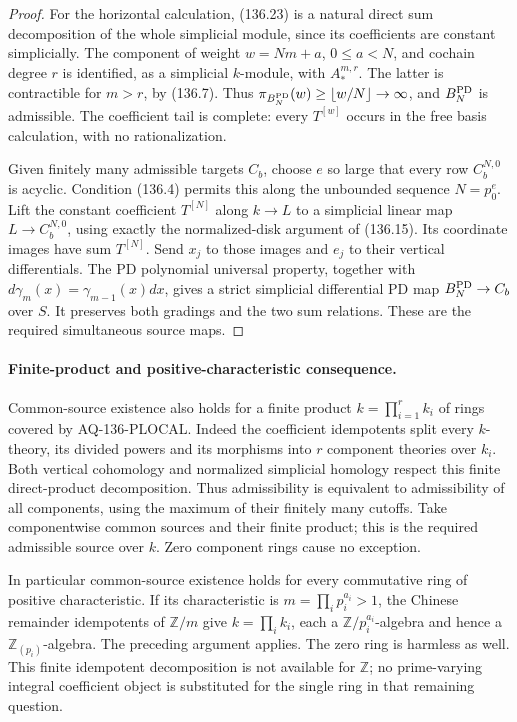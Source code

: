 \begin{proof}
For the horizontal calculation, (136.23) is a natural
direct sum decomposition of the whole simplicial module,
since its coefficients are constant simplicially.
The component of weight $w=Nm+a$, $0\leq a<N$, and
cochain degree $r$ is identified, as a simplicial
$k$-module, with $A_*^{m,r}$.  The latter is contractible
for $m>r$, by (136.7).  Thus
$\pi_{B_N^{\rm PD}}(w)\geq\lfloor w/N\rfloor\to\infty$,
and $B_N^{\rm PD}$ is admissible.  The coefficient tail
is complete: every $T^{[w]}$ occurs in the free basis
calculation, with no rationalization.

Given finitely many admissible targets $C_b$, choose
$e$ so large that every row $C_b^{N,0}$ is acyclic.
Condition (136.4) permits this along the unbounded
sequence $N=p_0^e$.  Lift the constant coefficient
$T^{[N]}$ along $k\to L$ to a simplicial linear map
$L\to C_b^{N,0}$, using exactly the normalized-disk
argument of (136.15).  Its coordinate images have
sum $T^{[N]}$.  Send $x_j$ to those images and
$e_j$ to their vertical differentials.  The PD
polynomial universal property, together with
$d\gamma_m(x)=\gamma_{m-1}(x)dx$, gives a strict
simplicial differential PD map
$B_N^{\rm PD}\to C_b$ over $S$.
It preserves both gradings and the two sum relations.
These are the required simultaneous source maps.
\end{proof}

\paragraph{Finite-product and positive-characteristic consequence.}
Common-source existence also holds for a finite product
$k=\prod_{i=1}^r k_i$ of rings covered by AQ-136-PLOCAL.
Indeed the coefficient idempotents split every
$k$-theory, its divided powers and its morphisms into
$r$ component theories over $k_i$.
Both vertical cohomology and normalized simplicial
homology respect this finite direct-product decomposition.
Thus admissibility is equivalent to admissibility of all
components, using the maximum of their finitely many
cutoffs.  Take componentwise common sources and their
finite product; this is the required admissible source
over $k$.  Zero component rings cause no exception.

In particular common-source existence holds for every
commutative ring of positive characteristic.  If its
characteristic is $m=\prod_i p_i^{a_i}>1$, the Chinese
remainder idempotents of $\mathbb Z/m$ give
$k=\prod_i k_i$, each a $\mathbb Z/p_i^{a_i}$-algebra
and hence a $\mathbb Z_{(p_i)}$-algebra.  The preceding
argument applies.  The zero ring is harmless as well.
This finite idempotent decomposition is not available
for $\mathbb Z$; no prime-varying integral coefficient
object is substituted for the single ring in that
remaining question.

